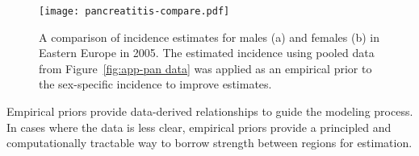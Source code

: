     \begin{figure}[h]
        \begin{center}
            \texttt{[image: pancreatitis-compare.pdf]}
            \caption{A comparison of incidence estimates for males (a) and
              females (b) in Eastern Europe in 2005.  The estimated incidence
              using pooled data from Figure~\ref{fig:app-pan data} was applied
              as an empirical prior to the sex-specific incidence to
              improve estimates.}
            \label{fig:app-pan compare}
        \end{center}
    \end{figure}

Empirical priors provide data-derived relationships to guide the
modeling process.  In cases where the data is less clear, empirical
priors provide a principled and computationally tractable way to
borrow strength between regions for estimation.
